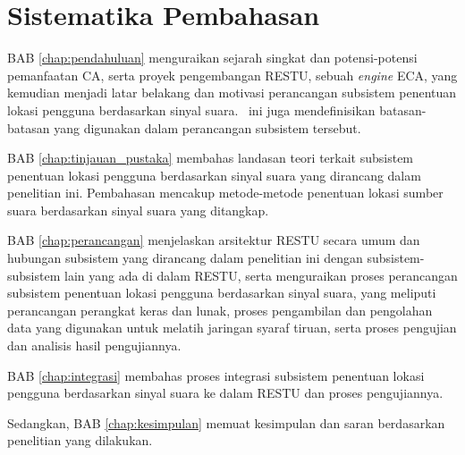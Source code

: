 \section{Sistematika Pembahasan}

BAB \ref{chap:pendahuluan} menguraikan sejarah singkat dan potensi-potensi pemanfaatan CA, serta proyek pengembangan RESTU, sebuah \textit{engine} ECA, yang kemudian menjadi latar belakang dan motivasi perancangan subsistem penentuan lokasi pengguna berdasarkan sinyal suara. \chaptername~ini juga mendefinisikan batasan-batasan yang digunakan dalam perancangan subsistem tersebut.

BAB \ref{chap:tinjauan_pustaka} membahas landasan teori terkait subsistem penentuan lokasi pengguna berdasarkan sinyal suara yang dirancang dalam penelitian ini. Pembahasan mencakup metode-metode penentuan lokasi sumber suara berdasarkan sinyal suara yang ditangkap.


BAB \ref{chap:perancangan} menjelaskan arsitektur RESTU secara umum dan hubungan subsistem yang dirancang dalam penelitian ini dengan subsistem-subsistem lain yang ada di dalam RESTU, serta menguraikan proses perancangan subsistem penentuan lokasi pengguna berdasarkan sinyal suara, yang meliputi perancangan perangkat keras dan lunak, proses pengambilan dan pengolahan data yang digunakan untuk melatih jaringan syaraf tiruan, serta proses pengujian dan analisis hasil pengujiannya.

BAB \ref{chap:integrasi} membahas proses integrasi subsistem penentuan lokasi pengguna berdasarkan sinyal suara ke dalam RESTU dan proses pengujiannya.

Sedangkan, BAB \ref{chap:kesimpulan} memuat kesimpulan dan saran berdasarkan penelitian yang dilakukan.
